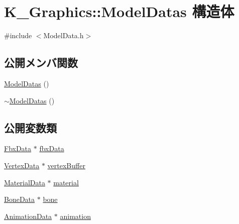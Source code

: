 \hypertarget{struct_k___graphics_1_1_model_datas}{}\section{K\+\_\+\+Graphics\+:\+:Model\+Datas 構造体}
\label{struct_k___graphics_1_1_model_datas}


{\ttfamily \#include $<$Model\+Data.\+h$>$}

\subsection*{公開メンバ関数}
\begin{DoxyCompactItemize}
\item 
\mbox{\hyperlink{struct_k___graphics_1_1_model_datas_a18293d9a4af2cec8e0fa6a32cefef8cd}{Model\+Datas}} ()
\item 
\mbox{\hyperlink{struct_k___graphics_1_1_model_datas_a45bd5bbd979a3bbac5ee319b8bb27a08}{$\sim$\+Model\+Datas}} ()
\end{DoxyCompactItemize}
\subsection*{公開変数類}
\begin{DoxyCompactItemize}
\item 
\mbox{\hyperlink{class_k___graphics_1_1_fbx_data}{Fbx\+Data}} $\ast$ \mbox{\hyperlink{struct_k___graphics_1_1_model_datas_a6450e2956d9640e286f7f959b690ba59}{fbx\+Data}}
\item 
\mbox{\hyperlink{class_k___graphics_1_1_vertex_data}{Vertex\+Data}} $\ast$ \mbox{\hyperlink{struct_k___graphics_1_1_model_datas_a1d79192ceb798263763dc6051971168b}{vertex\+Buffer}}
\item 
\mbox{\hyperlink{class_k___graphics_1_1_material_data}{Material\+Data}} $\ast$ \mbox{\hyperlink{struct_k___graphics_1_1_model_datas_a7534ee37fab0a8398884dd398dcd0532}{material}}
\item 
\mbox{\hyperlink{class_k___graphics_1_1_bone_data}{Bone\+Data}} $\ast$ \mbox{\hyperlink{struct_k___graphics_1_1_model_datas_aad2b2491b744969be688b5d3dc1006ea}{bone}}
\item 
\mbox{\hyperlink{class_k___graphics_1_1_animation_data}{Animation\+Data}} $\ast$ \mbox{\hyperlink{struct_k___graphics_1_1_model_datas_a2998f1b8e3bb0573ba89a91c73f5eb4e}{animation}}
\end{DoxyCompactItemize}


